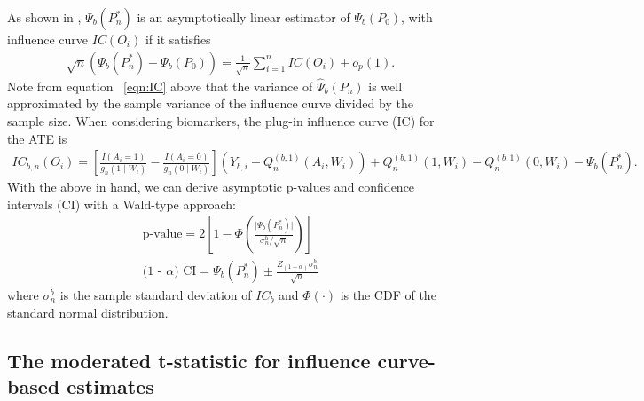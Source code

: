 As shown in \cite{van2011targeted}, $\Psi_b(P^*_n)$ is an asymptotically
linear estimator of $\Psi_b(P_0)$, with influence curve $IC(O_i)$ if it
satisfies
\begin{eqnarray}
\sqrt{n}(\Psi_b(P^*_n) - \Psi_b(P_0)) = \frac{1}{\sqrt{n}}\sum^{n}_{i =
  1}IC(O_i) + o_p(1).
\label{eqn:IC}
\end{eqnarray}
Note from equation ~\ref{eqn:IC} above that the variance of $\hat{\Psi}_b(P_n)$
is well approximated by the sample variance of the influence curve divided by
the sample size. When considering biomarkers, the plug-in influence curve (IC)
for the ATE is
\begin{eqnarray*}
IC_{b, n}(O_i) = \left[ \frac{I(A_i = 1)}{g_n(1 \mid W_i)} - \frac{I(A_i =
0)}{g_n(0 \mid W_i)} \right] (Y_{b, i} - Q^{(b, 1)}_{n}(A_i, W_i)) +
Q^{(b, 1)}_{n}(1, W_i) - Q^{(b,1)}_{n}(0, W_i) - \Psi_b(P^*_n).
\end{eqnarray*}
With the above in hand, we can derive asymptotic p-values and confidence
intervals (CI) with a Wald-type approach:
\begin{eqnarray}
\mbox{p-value} = 2 \left[ 1 -
  \Phi(\frac{\vert\Psi_b(P^*_n)\vert}{\sigma^b_n/\sqrt{n}}) \right] \\
\mbox{(1 - $\alpha$) CI} = \Psi_b(P^*_n) \pm
  \frac{Z_{(1 - \alpha)} \sigma^b_{n}}{\sqrt{n}}
\label{eqn:tmleInference}
\end{eqnarray}
where $\sigma^b_{n}$ is the sample standard deviation of $IC_b$ and
$\Phi(\cdot)$ is the CDF of the standard normal distribution.

\subsection{The moderated t-statistic for influence curve-based
estimates}\label{modtIC}

